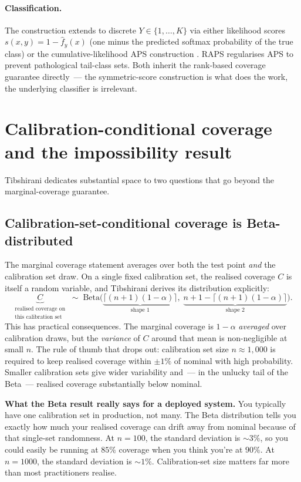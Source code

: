 \documentclass[letterpaper,11pt,leqno]{article}
\begin{document}
\paragraph{Classification.} The construction extends to discrete $Y \in \{1, \dots, K\}$ via either likelihood scores $s(x, y) = 1 - \hat{f}_y(x)$ (one minus the predicted softmax probability of the true class) or the cumulative-likelihood APS construction \cite{sadinle2019aps}. RAPS regularises APS to prevent pathological tail-class sets. Both inherit the rank-based coverage guarantee directly~--- the symmetric-score construction is what does the work, the underlying classifier is irrelevant.

\section{Calibration-conditional coverage and the impossibility result}\label{s:result}

Tibshirani dedicates substantial space to two questions that go beyond the marginal-coverage guarantee.

\subsection*{Calibration-set-conditional coverage is Beta-distributed}

The marginal coverage statement averages over both the test point \emph{and} the calibration set draw. On a single fixed calibration set, the realised coverage $C$ is itself a random variable, and Tibshirani derives its distribution explicitly:
\begin{equation*}
\underbrace{C}_{\substack{\text{realised coverage on}\\\text{this calibration set}}}
\;\sim\;
\text{Beta}\bigl(
\underbrace{\lceil (n+1)(1-\alpha)\rceil}_{\text{shape 1}}
,\;
\underbrace{n+1-\lceil (n+1)(1-\alpha)\rceil}_{\text{shape 2}}
\bigr).
\end{equation*}
This has practical consequences. The marginal coverage is $1 - \alpha$ \emph{averaged} over calibration draws, but the \emph{variance} of $C$ around that mean is non-negligible at small $n$. The rule of thumb that drops out: calibration set size $n \approx 1{,}000$ is required to keep realised coverage within $\pm 1\%$ of nominal with high probability. Smaller calibration sets give wider variability and~--- in the unlucky tail of the Beta~--- realised coverage substantially below nominal.

\begin{theoremexplain}
\textbf{What the Beta result really says for a deployed system.} You typically have one calibration set in production, not many. The Beta distribution tells you exactly how much your realised coverage can drift away from nominal because of that single-set randomness. At $n = 100$, the standard deviation is $\sim 3\%$, so you could easily be running at $85\%$ coverage when you think you're at $90\%$. At $n = 1000$, the standard deviation is $\sim 1\%$. Calibration-set size matters far more than most practitioners realise.
\end{theoremexplain}
\end{document}
